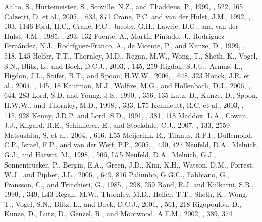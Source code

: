 \documentclass[12pt,preprint]{aastex}
\begin{document}
\begin{thebibliography}{}
 Aalto, S., Huttemeister, S., Scoville, N.Z., and Thaddeus, P., 1999, \aj, 522, 165
 Calzetti, D. et al., 2005, \apj, 633, 871
 Crane, P.C. and van der Hulst, J.M., 1992, \aj, 103, 1146
 Ford, H.C., Crane, P.C., Jacoby, G.H., Lawrie, D.G., and van der Hulst, J.M., 1985, \apj, 293, 132
 Fuente, A., Mart\'{i}n-Pintado, J., Rodr\'{i}guez-Fern\'{a}ndez, N.J., Rodr\'{i}guez-Franco, A., de Vicente, P., and Kunze, D., 1999, \apj, 518, L45 
 Helfer, T.T., Thornley, M.D., Regan, M.W., Wong, T., Sheth, K., Vogel, S.N., Blitz, L., and Bock, D.C.J., 2003, \apjs, 145, 259
 Higdon, S.J.U., Armus, L., Higdon, J.L., Soifer, B.T., and Spoon, H.W.W., 2006, \apj, 648, 323
 Houck, J.R. et al., 2004, \apjs, 145, 18
 Kaufman, M.J., Wolfire, M.G., and Hollenbach, D.J., 2006, \apj, 644, 283 
 Lord, S.D. and Young, J.S., 1990, \apj, 356, 135
 Lutz, D., Kunze, D., Spoon, H.W.W., and Thornley, M.D., 1998, \aap, 333, L75
 Kennicutt, R.C. et al., 2003, \pasp, 115, 928
 Kenny, J.D.P. and Lord, S.D., 1991, \apj, 381, 118
 Maddox, L.A., Cowan, J.J., Kilgard, R.E., Schinnerer, E., and Stockdale, C.J., 2007, \aj, 133, 2559
 Matsushita, S. et al., 2004, \apj, 616, L55
 Meijerink, R., Tilanus, R.P.I., Dullemond, C.P., Israel, F.P., and van der Werf, P.P., 2005, \aap, 430, 427
 Neufeld, D.A., Melnick, G.J., and Harwit, M., 1998, \apj, 506, L75
 Neufeld, D.A., Melnich, G.J., Sonnentrucker, P., Bergin, E.A., Green, J.D., Kim, K.H., Watson, D.M., Forrest, W.J., and Pipher, J.L., 2006, \apj, 649, 816 
 Palumbo, G.G.C., Fabbiano, G., Fransson, C., and Trinchieri, G., 1985, \apj, 298, 259 
 Rand, R.J. and Kulkarni, S.R., 1990, \apj, 349, L43
 Regan, M.W., Thornley, M.D., Helfer, T.T., Sheth, K., Wong, T., Vogel, S.N., Blitz, L., and Bock, D.C.J., 2001, \apj, 561, 218
 Rigopoulou, D., Kunze, D., Lutz, D., Genzel, R., and Moorwood, A.F.M., 2002, \aap, 389, 374

\end{thebibliography}
\end{document}
